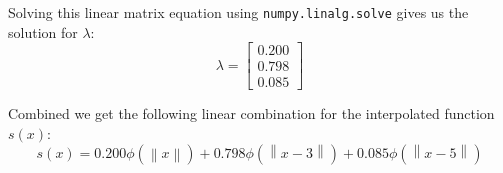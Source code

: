 Solving this linear matrix equation using \texttt{numpy.linalg.solve} gives us the solution for $\lambda$:
\begin{equation}
	\lambda=\begin{bmatrix}
	0.200 \\0.798  \\0.085
	\end{bmatrix}
\end{equation}

Combined we get the following linear combination for the interpolated function $s(x)$:
\begin{equation}
	s(x)=0.200\phi(\left\|x\right\|)+
		0.798\phi(\left\|x-3\right\|)+
		0.085\phi(\left\|x-5\right\|)
\end{equation}



